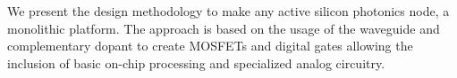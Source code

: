 We present the design methodology to make any active silicon photonics node, a monolithic platform. 
The approach is based on the usage of the waveguide and complementary dopant to create MOSFETs and digital gates allowing the inclusion of basic on-chip processing and specialized analog circuitry.
